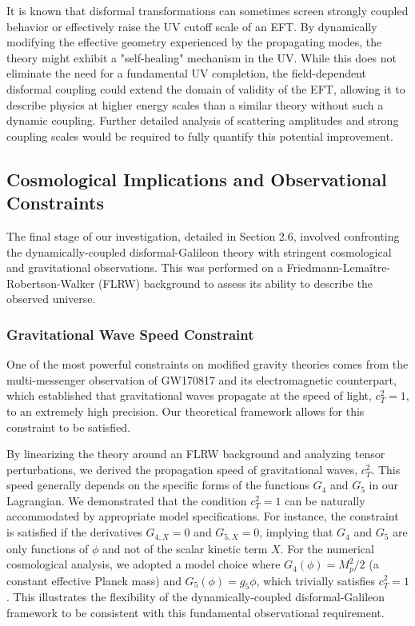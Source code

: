 \documentclass[twocolumn]{aastex631}
\begin{document}
It is known that disformal transformations can sometimes screen strongly coupled behavior or effectively raise the UV cutoff scale of an EFT. By dynamically modifying the effective geometry experienced by the propagating modes, the theory might exhibit a "self-healing" mechanism in the UV. While this does not eliminate the need for a fundamental UV completion, the field-dependent disformal coupling could extend the domain of validity of the EFT, allowing it to describe physics at higher energy scales than a similar theory without such a dynamic coupling. Further detailed analysis of scattering amplitudes and strong coupling scales would be required to fully quantify this potential improvement.

\subsection{Cosmological Implications and Observational Constraints}

The final stage of our investigation, detailed in Section 2.6, involved confronting the dynamically-coupled disformal-Galileon theory with stringent cosmological and gravitational observations. This was performed on a Friedmann-Lema\^itre-Robertson-Walker (FLRW) background to assess its ability to describe the observed universe.

\subsubsection{Gravitational Wave Speed Constraint}
One of the most powerful constraints on modified gravity theories comes from the multi-messenger observation of GW170817 and its electromagnetic counterpart, which established that gravitational waves propagate at the speed of light, $c_T^2=1$, to an extremely high precision. Our theoretical framework allows for this constraint to be satisfied.

By linearizing the theory around an FLRW background and analyzing tensor perturbations, we derived the propagation speed of gravitational waves, $c_T^2$. This speed generally depends on the specific forms of the functions $G_4$ and $G_5$ in our Lagrangian. We demonstrated that the condition $c_T^2=1$ can be naturally accommodated by appropriate model specifications. For instance, the constraint is satisfied if the derivatives $G_{4,X}=0$ and $G_{5,X}=0$, implying that $G_4$ and $G_5$ are only functions of $\phi$ and not of the scalar kinetic term $X$. For the numerical cosmological analysis, we adopted a model choice where $G_4(\phi) = M_p^2/2$ (a constant effective Planck mass) and $G_5(\phi) = g_5 \phi$, which trivially satisfies $c_T^2=1$. This illustrates the flexibility of the dynamically-coupled disformal-Galileon framework to be consistent with this fundamental observational requirement.
\end{document}
